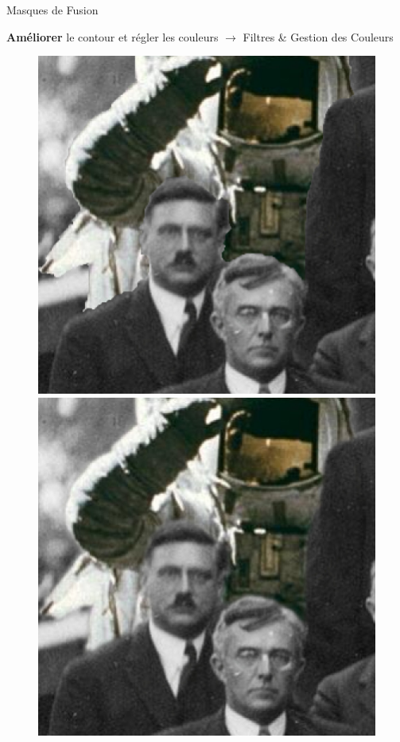 \begin{frame}{Masques de Fusion}
\begin{overprint}
\begin{enumerate}
{		\item[4.] \textbf{Améliorer} le contour et régler les couleurs $\rightarrow$ Filtres \& Gestion des Couleurs
			\begin{figure}
		\centering
			\begin{minipage}{.5\textwidth}
				\includegraphics[width=.9\textwidth]{Images/mask/mask8}
			\end{minipage}%
			\begin{minipage}{.5\textwidth}
				\includegraphics[width=.9\textwidth]{Images/mask/mask8_2}
			\end{minipage}
		\end{figure}
	}





		\end{enumerate}

	\end{overprint}
	\end{frame}

